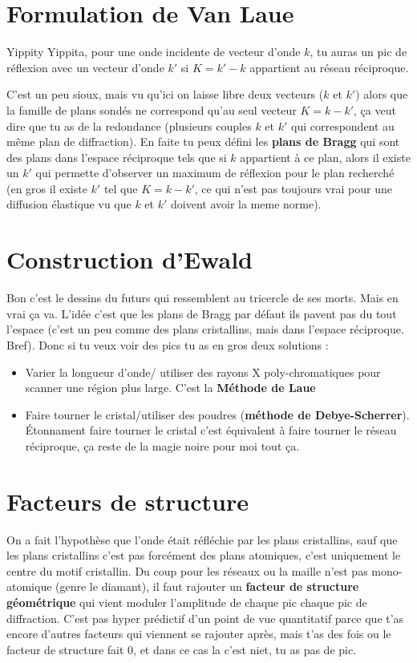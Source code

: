 \documentclass[a4paper]{report}
\begin{document}
  \section{Formulation de Van Laue}
  Yippity Yippita, pour une onde incidente de vecteur d'onde $k$, tu auras un pic de réflexion avec un vecteur d'onde $k'$ si $K=k'-k$ appartient au réseau réciproque.
  
  C'est un peu sioux, mais vu qu'ici on laisse libre deux vecteurs ($k$ et $k'$) alors que la famille de plans sondés ne correspond qu'au seul vecteur $K=k-k'$, ça veut dire que tu as de la redondance (plusieurs couples $k$ et $k'$ qui correspondent au même plan de diffraction). En faite tu peux défini les \textbf{plans de Bragg} qui sont des plans dans l'espace réciproque tels que si $k$ appartient à ce plan, alors il existe un $k'$ qui permette d'observer un maximum de réflexion pour le plan recherché (en gros il existe $k'$ tel que $K=k-k'$, ce qui n'est pas toujours vrai pour une diffusion élastique vu que $k$ et $k'$ doivent avoir la meme norme).
  \section{Construction d'Ewald}
  Bon c'est le dessins du futurs qui ressemblent au tricercle de ses morts. Mais en vrai ça va. L'idée c'est que les plans de Bragg par défaut ils pavent pas du tout l'espace (c'est un peu comme des plans cristallins, mais dans l'espace réciproque. Bref). Donc si tu veux voir des pics tu as en gros deux solutions :
  \begin{itemize}
  \item Varier la longueur d'onde/ utiliser des rayons X poly-chromatiques pour scanner une région plus large. C'est la \textbf{Méthode de Laue}
  \item Faire tourner le cristal/utiliser des poudres (\textbf{méthode de Debye-Scherrer}). Étonnament faire tourner le cristal c'est équivalent à faire tourner le réseau réciproque, ça reste de la magie noire pour moi tout ça.
  \end{itemize}
  \section{Facteurs de structure}
  On a fait l'hypothèse que l'onde était réfléchie par les plans cristallins, sauf que les plans cristallins c'est pas forcément des plans atomiques, c'est uniquement le centre du motif cristallin. Du coup pour les réseaux ou la maille n'est pas mono-atomique (genre le diamant), il faut rajouter un \textbf{facteur de structure géométrique} qui vient moduler l'amplitude de chaque pic chaque pic de diffraction. C'est pas hyper prédictif d'un point de vue quantitatif parce que t'as encore d'autres facteurs qui viennent se rajouter après, mais t'as des fois ou le facteur de structure fait 0, et dans ce cas la c'est niet, tu as pas de pic.
  
\end{document}
